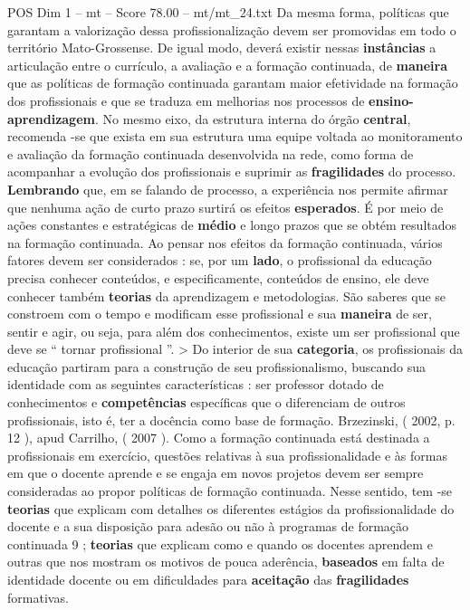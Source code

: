 \begin{textsample}{POS Dim 1 – mt – Score 78.00 – mt/mt\_24.txt}
Da mesma forma, políticas que garantam a valorização dessa profissionalização devem ser promovidas em todo o território Mato-Grossense.
De igual modo, deverá existir nessas \textbf{instâncias} a articulação entre o currículo, a avaliação e a formação continuada, de \textbf{maneira} que as políticas de formação continuada garantam maior efetividade na formação dos profissionais e que se traduza em melhorias nos processos de \textbf{ensino-aprendizagem}.
No mesmo eixo, da estrutura interna do órgão \textbf{central}, recomenda -se que exista em sua estrutura uma equipe voltada ao monitoramento e avaliação da formação continuada desenvolvida na rede, como forma de acompanhar a evolução dos profissionais e suprimir as \textbf{fragilidades} do processo. \textbf{Lembrando} que, em se falando de processo, a experiência nos permite afirmar que nenhuma ação de curto prazo surtirá os efeitos \textbf{esperados}.
É por meio de ações constantes e estratégicas de \textbf{médio} e longo prazos que se obtém resultados na formação continuada.
Ao pensar nos efeitos da formação continuada, vários fatores devem ser considerados : se, por um \textbf{lado}, o profissional da educação precisa conhecer conteúdos, e especificamente, conteúdos de ensino, ele deve conhecer também \textbf{teorias} da aprendizagem e metodologias.
São saberes que se constroem com o tempo e modificam esse profissional e sua \textbf{maneira} de ser, sentir e agir, ou seja, para além dos conhecimentos, existe um ser profissional que deve se “ tornar profissional ”. > Do interior de sua \textbf{categoria}, os profissionais da educação partiram para a construção de seu profissionalismo, buscando sua identidade com as seguintes características : ser professor dotado de conhecimentos e \textbf{competências} específicas que o diferenciam de outros profissionais, isto é, ter a docência como base de formação.
Brzezinski, ( 2002, p. 12 ), apud Carrilho, ( 2007 ).
Como a formação continuada está destinada a profissionais em exercício, questões relativas à sua profissionalidade e às formas em que o docente aprende e se engaja em novos projetos devem ser sempre consideradas ao propor políticas de formação continuada.
Nesse sentido, tem -se \textbf{teorias} que explicam com detalhes os diferentes estágios da profissionalidade do docente e a sua disposição para adesão ou não à programas de formação continuada 9 ; \textbf{teorias} que explicam como e quando os docentes aprendem e outras que nos mostram os motivos de pouca aderência, \textbf{baseados} em falta de identidade docente ou em dificuldades para \textbf{aceitação} das \textbf{fragilidades} formativas.

\end{textsample}
